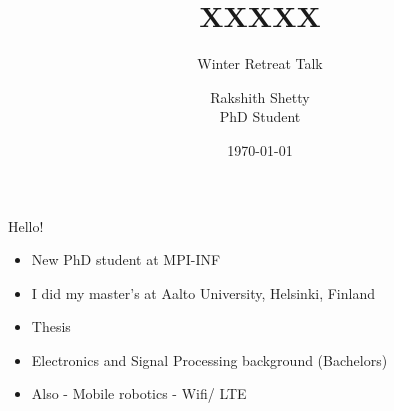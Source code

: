 \documentclass{beamer}
\begin{document}

\title{XXXXX}
\subtitle{Winter Retreat Talk}
\author[Rakshith Shetty]{Rakshith Shetty\\[4mm] {\small PhD Student}}
\date{\today}

\frame{\titlepage} 


\begin{frame}{Hello!}
  \begin{itemize}
  \item New PhD student at MPI-INF
  \item I did my master's at Aalto University, Helsinki, Finland
  \item Thesis 
  \item Electronics and Signal Processing background (Bachelors)
  \item Also
	- Mobile robotics 
	- Wifi/ LTE
  \end{itemize}
\end{frame}
\end{document}
